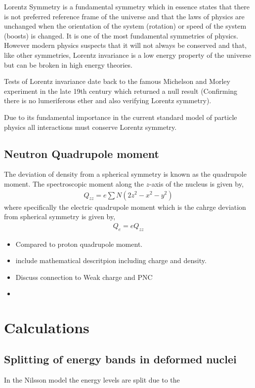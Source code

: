 \documentclass[10pt,a4paper, twoside]{report}
\begin{document}
Lorentz Symmetry is a fundamental symmetry which in essence states that there is not preferred reference frame of the universe and that the laws of physics are unchanged when the orientation of the system (rotation) or speed of the system (boosts) is changed. It is one of the most fundamental symmetries of physics. However modern physics suspects that it will not always be conserved and that, like other symmetries, Lorentz invariance is a low energy property of the universe but can be broken in high energy theories.

Tests of Lorentz invariance date back to the famous Michelson and Morley experiment in the late 19th century \cite{Michelson1887} which returned a null result (Confirming there is no lumeriferous ether and also verifying Lorentz symmetry). 


Due to its fundamental importance in the current standard model of particle physics all interactions must conserve Lorentz symmetry.
\section{Neutron Quadrupole moment}
The deviation of density from a spherical symmetry is known as the quadrupole moment. The spectroscopic moment along the $z$-axis of the nucleus is given by,
\begin{align*}
Q_{zz} = e \sum{N}\left(2z^2 - x^2 -y^2\right)
\end{align*}
where specifically the electric quadrupole moment which is the cahrge deviation from spherical symmetry is given by,
\begin{align*}
Q_{e} = eQ_{zz}
\end{align*}
\begin{itemize}
\item Compared to proton quadrupole moment.
\item include mathematical descritpion including charge and density.
\item Discuss connection to Weak charge and PNC
\item 
\end{itemize}
\chapter{Calculations}
\section{Splitting of energy bands in deformed nuclei}
In the Nilsson model the energy levels are split due to the 
\end{document}

